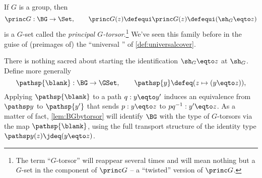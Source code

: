 \begin{example}\label{def:principaltorsor}
  If $G$ is a group, then
  \[
    \princ G:\BG\to\Set,
    \qquad\princ G(z)\defequi\princ G(z)\defequi(\sh_G \eqto z)
  \]
  is a $G$-set called the \emph{principal $G$-torsor}.\footnote{%
    The term ``$G$-torsor'' will reappear several times and will mean nothing but a $G$-set in the component of $\princ G$ -- a ``twisted'' version of $\princ G$.}
  We've seen this family before in the guise of (preimages of) the
  ``universal \covering'' of \cref{def:universalcover}.

  There is nothing sacred about starting the identification
  $\sh_G \eqto z$ at $\sh_G$.
  Define more generally
  \begin{equation}\label{eq:pathsp}
    \pathsp{\blank}:\BG\to\GSet,
    \qquad
    \pathsp{y} \defeq (z \mapsto (y\eqto z)),
  \end{equation}
  Applying $\pathsp{\blank}$ to a path $q:y\eqto y'$
  induces an equivalence from $\pathsp y$ to $\pathsp {y'}$ that sends $p:y \eqto z$
  to $pq^{-1}:y'\eqto z$.
  As a matter of fact, \cref{lem:BGbytorsor} will identify $\BG$ with the type of
  $G$-torsors via the map $\pathsp{\blank}$,
  using the full transport structure of the identity 
  type $\pathsp y(z)\jdeq(y \eqto z)$.
\end{example}

